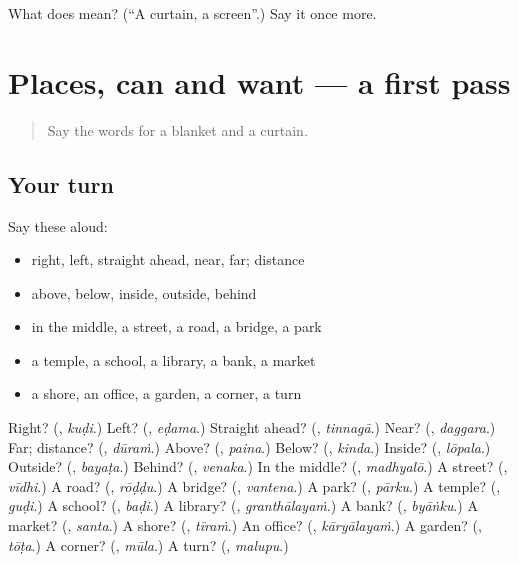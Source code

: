 \begin{tcolorbox}[breakable,colback=teal!4,colframe=teal!35!black,title={Before you move on}]
What does  mean? (\textquotedblleft{}A curtain, a screen\textquotedblright{}.) Say it once more.
\end{tcolorbox}
\section[(dialogue)]{Places, can and want — a first pass}

\label{lesson:TE-R109-first-pass-places-can-and-want}



\begin{quote}
Say the words for a blanket and a curtain.
\end{quote}

\subsection*{Your turn}
Say these aloud:

\begin{itemize}
\raggedright
  \item right, left, straight ahead, near, far; distance
  \item above, below, inside, outside, behind
  \item in the middle, a street, a road, a bridge, a park
  \item a temple, a school, a library, a bank, a market
  \item a shore, an office, a garden, a corner, a turn
\end{itemize}

\begin{tcolorbox}[breakable,colback=teal!4,colframe=teal!35!black,title={Before you move on}]
Right? (\textbf{}, \emph{kuḍi}.) Left? (\textbf{}, \emph{eḍama}.) Straight ahead? (\textbf{}, \emph{tinnagā}.) Near? (\textbf{}, \emph{daggara}.) Far; distance? (\textbf{}, \emph{dūraṁ}.) Above? (\textbf{}, \emph{paina}.) Below? (\textbf{}, \emph{kinda}.) Inside? (\textbf{}, \emph{lōpala}.) Outside? (\textbf{}, \emph{bayaṭa}.) Behind? (\textbf{}, \emph{venaka}.) In the middle? (\textbf{}, \emph{madhyalō}.) A street? (\textbf{}, \emph{vīdhi}.) A road? (\textbf{}, \emph{rōḍḍu}.) A bridge? (\textbf{}, \emph{vantena}.) A park? (\textbf{}, \emph{pārku}.) A temple? (\textbf{}, \emph{guḍi}.) A school? (\textbf{}, \emph{baḍi}.) A library? (\textbf{}, \emph{granthālayaṁ}.) A bank? (\textbf{}, \emph{byāṅku}.) A market? (\textbf{}, \emph{santa}.) A shore? (\textbf{}, \emph{tīraṁ}.) An office? (\textbf{}, \emph{kāryālayaṁ}.) A garden? (\textbf{}, \emph{tōṭa}.) A corner? (\textbf{}, \emph{mūla}.) A turn? (\textbf{}, \emph{malupu}.)
\end{tcolorbox}
